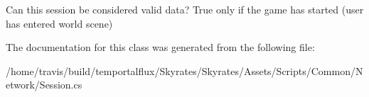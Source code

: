 Can this session be considered valid data? True only if the game has started (user has entered world scene) 



The documentation for this class was generated from the following file\-:\begin{DoxyCompactItemize}
\item 
/home/travis/build/temportalflux/\-Skyrates/\-Skyrates/\-Assets/\-Scripts/\-Common/\-Network/Session.\-cs\end{DoxyCompactItemize}

